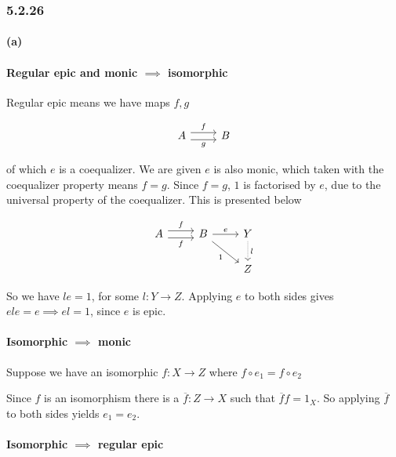 \documentclass{article}
\begin{document}
\subsubsection*{5.2.26}
\paragraph{(a)}

\paragraph{Regular epic and monic $\implies$ isomorphic}
Regular epic means we have maps $f, g$

\begin{equation*}
\label{eqn5143}
\begin{tikzcd}
 A \ar[r,shift left=.75ex,"f"]
   \ar[r,shift right=.75ex,swap,"g"] & B
\end{tikzcd}
\end{equation*}

of which $e$ is a coequalizer. We are given $e$ is also monic, which taken with the coequalizer property means $f=g$. Since $f=g$, $1$ is factorised by $e$, due to the universal property of the coequalizer. This is presented below

\begin{equation*}
\begin{tikzcd}
A \ar[r,shift left=.75ex,"f"]
  \ar[r,shift right=.75ex,swap,"f"]
&
B \ar[r,"e"] \ar[dr,swap,"1"]
&
Y \ar[d,densely dotted, "l"]
\\
& & Z
\end{tikzcd}
\end{equation*}

So we have $le=1$, for some $l\colon Y \rightarrow Z$. Applying $e$ to both sides gives $ele=e \implies el=1$, since $e$ is epic.

\paragraph{Isomorphic $\implies$ monic}

Suppose we have an isomorphic $f: X \rightarrow Z$ where
$f\circ e_1 = f\circ e_2$

Since $f$ is an isomorphism there is a $\overline{f}:Z\rightarrow X$ such that $\overline{f}f=1_X$. So applying $\overline{f}$ to both sides yields $e_1=e_2$.

\paragraph{Isomorphic $\implies$ regular epic}
\end{document}
